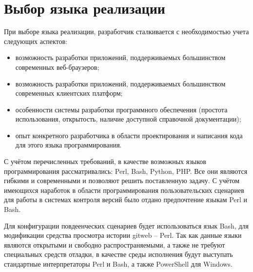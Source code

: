 \section{Выбор языка реализации} \label{technologic_langiage}


При выборе языка реализации, разработчик сталкивается с необходимостью учета следующих аспектов:
\begin{itemize}
	\item возможность разработки приложений, поддерживаемых большинством современных веб-браузеров;
	\item возможность разработки приложений, поддерживаемых большинством современных клиентских платформ;
	\item особенности системы разработки программного обеспечения (простота использования, открытость, наличие доступной справочной документации);
	\item опыт конкретного разработчика в области проектирования и написания кода для этого языка программирования.
\end{itemize}

С учётом перечисленных требований, в качестве возможных языков программирования рассматривались: Perl, Bash, Python, PHP. Все они являются гибкими и современными и позволяют решить поставленную задачу. С учётом имеющихся наработок в области программирования пользовательских сценариев для работы в системах контроля версий было отдано предпочтение языкам Perl и Bash.

\vspace{\baselineskip}
Для конфигурации повдеенческих сценариев будет использоваться язык Bash, для модификации средства просмотра истории gitweb -- Perl. Так как данные языки являются открытыми и свободно распространяемыми, а также не требуют специальных средств отладки, в качестве среды исполнения будут выступать стандартные интерпретаторы Perl и Bash, а также PowerShell для Windows.